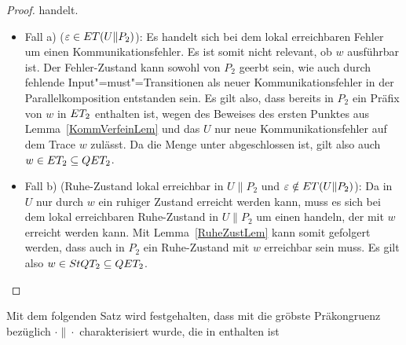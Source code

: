 \begin{proof}
  handelt.
  \begin{itemize}
    \item Fall a) ($\varepsilon\in ET (U\|P_2)$): Es handelt sich bei dem lokal
      erreichbaren Fehler um einen Kommunikationsfehler. Es ist somit nicht
      relevant, ob $w$ ausführbar ist. Der Fehler-Zustand kann sowohl von $P_2$
      geerbt sein, wie auch durch fehlende Input"=must"=Transitionen als neuer
      Kommunikationsfehler in der Parallelkomposition entstanden sein. Es gilt
      also, dass bereits in $P_2$ ein Präfix von $w$ in $ET _2$ enthalten ist,
      wegen des Beweises des ersten Punktes aus Lemma~\ref{KommVerfeinLem} und
      das $U$ nur neue Kommunikationsfehler auf dem Trace $w$ zulässt. Da die
      Menge \ET{} unter \cont{} abgeschlossen ist, gilt also auch $w\in ET
      _2\subseteq QET _2$.
    \item Fall b) (Ruhe-Zustand lokal erreichbar in $U\|P_2$ und
      $\varepsilon\notin ET (U\|P_2)$): Da in $U$ nur durch $w$ ein ruhiger
      Zustand erreicht werden kann, muss es sich bei dem lokal erreichbaren
      Ruhe-Zustand in $U\|P_2$ um einen handeln, der mit $w$ erreicht werden
      kann. Mit Lemma~\ref{RuheZustLem} kann somit gefolgert werden, dass auch
      in $P_2$ ein Ruhe-Zustand mit $w$ erreichbar sein muss. Es gilt also
      $w\in StQT _2\subseteq QET _2$.
  \end{itemize}
\end{proof}

Mit dem folgenden Satz wird festgehalten, dass mit \QRel{} die gröbste
Präkongruenz bezüglich $\cdot\|\cdot$ charakterisiert wurde, die in \QBRel{}
enthalten ist

